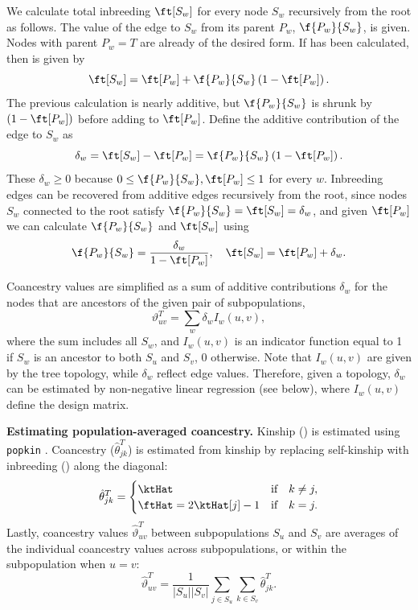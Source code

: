 \documentclass[11pt]{article}
\begin{document}
We calculate total inbreeding $\ft[S_w]$ for every node $S_w$ recursively from the root as follows.
The value of the edge to $S_w$ from its parent $P_w$, $\f{P_w}{S_w}$, is given.
Nodes with parent $P_w = T$ are already of the desired form.
If \ft[P_w] has been calculated, then \ft[S_w] is given by \citep{ochoa_fst1}
$$
\ft[S_w] = \ft[P_w] + \f{P_w}{S_w} \left( 1 - \ft[P_w] \right).
$$
The previous calculation is nearly additive, but $\f{P_w}{S_w}$ is shrunk by $\left( 1 - \ft[P_w] \right)$ before adding to $\ft[P_w]$.
Define the additive contribution of the edge to $S_w$ as
$$
\delta_w = \ft[S_w] - \ft[P_w] = \f{P_w}{S_w} \left( 1 - \ft[P_w] \right).
$$
These $\delta_w \ge 0$ because $0 \le \f{P_w}{S_w}, \ft[P_w] \le 1$ for every $w$.
Inbreeding edges can be recovered from additive edges recursively from the root, since nodes $S_w$ connected to the root satisfy
$\f{P_w}{S_w} = \ft[S_w] = \delta_w$,
and given $\ft[P_w]$ we can calculate $\f{P_w}{S_w}$ and $\ft[S_w]$ using
\begin{equation*}
  \f{P_w}{S_w}
  =
  \frac{ \delta_w }{ 1 - \ft[P_w] },
  \quad
  \ft[S_w]
  =
  \ft[P_w] + \delta_w
  .
\end{equation*}

Coancestry values are simplified as a sum of additive contributions $\delta_w$ for the nodes that are ancestors of the given pair of subpopulations,
\begin{equation}
  \label{eq:coanc_tree_additive}
  \vartheta_{uv}^T
  =
  \sum_w \delta_w I_w(u,v)
  ,
\end{equation}
where the sum includes all $S_w$, and $I_w(u,v)$ is an indicator function equal to 1 if $S_w$ is an ancestor to both $S_u$ and $S_v$, 0 otherwise.
Note that $I_w(u,v)$ are given by the tree topology, while $\delta_w$ reflect edge values.
Therefore, given a topology, $\delta_w$ can be estimated by non-negative linear regression (see below), where $I_w(u,v)$ define the design matrix.

\textbf{Estimating population-averaged coancestry.}
Kinship (\ktHat) is estimated using \texttt{popkin} \citep{ochoa_estimating_2021}.
Coancestry ($\hat{\theta}_{jk}^T$) is estimated from kinship by replacing self-kinship with inbreeding (\ftHat) along the diagonal:
\begin{equation}
  \label{eq:kinship_to_coanc}
  \hat{\theta}_{jk}^T
  =
  \begin{cases}
    \ktHat & \text{if} \quad k \ne j, \\
    \ftHat = 2 \ktHat[j] - 1 & \text{if} \quad k = j.
  \end{cases}
\end{equation}
Lastly, coancestry values $\hat{\vartheta}_{uv}^T$ between subpopulations $S_u$ and $S_v$ are averages of the individual coancestry values across subpopulations, or within the subpopulation when $u=v$:
$$
\hat{\vartheta}_{uv}^T
=
\frac{1}{|S_u||S_v|} \sum_{j \in S_u} \sum_{k \in S_v} \hat{\theta}_{jk}^T
.
$$
\end{document}
